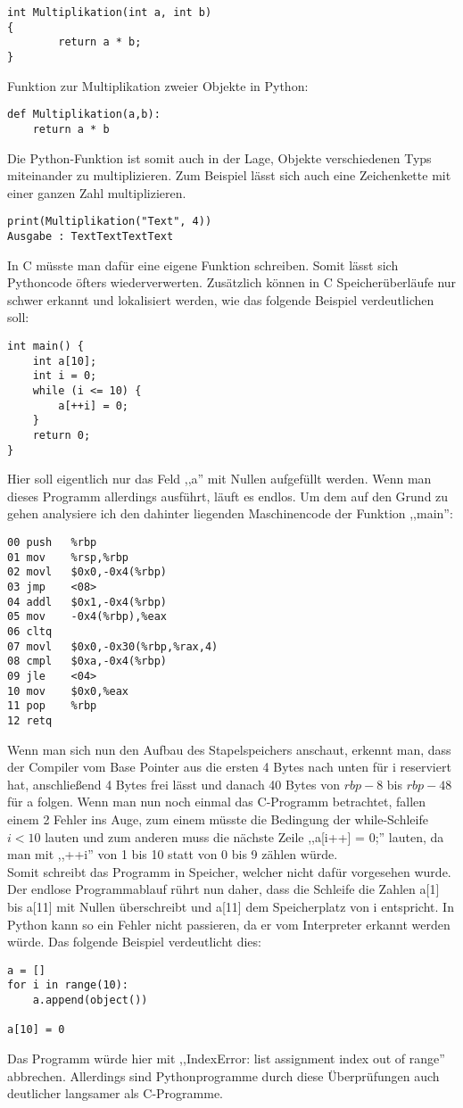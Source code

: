 \documentclass[hidelinks]{article}
\begin{document}
\begin{lstlisting}
int Multiplikation(int a, int b)
{
        return a * b;
}
\end{lstlisting}
Funktion zur Multiplikation zweier Objekte in Python:
\begin{lstlisting}
def Multiplikation(a,b):
    return a * b
\end{lstlisting}
Die Python-Funktion ist somit auch in der Lage, Objekte verschiedenen Typs miteinander zu multiplizieren. Zum Beispiel lässt sich auch eine Zeichenkette mit einer ganzen Zahl multiplizieren.
\begin{lstlisting}
print(Multiplikation("Text", 4))
Ausgabe : TextTextTextText
\end{lstlisting}
In C müsste man dafür eine eigene Funktion schreiben. Somit lässt sich Pythoncode öfters wiederverwerten.
Zusätzlich können in C Speicherüberläufe nur schwer erkannt und lokalisiert werden, wie das folgende Beispiel verdeutlichen soll:
\begin{lstlisting}
int main() {
    int a[10];
    int i = 0;
    while (i <= 10) {
        a[++i] = 0;
    }
    return 0;
}
\end{lstlisting}
Hier soll eigentlich nur das Feld ,,a'' mit Nullen aufgefüllt werden. Wenn man dieses Programm allerdings ausführt, läuft es endlos. Um dem auf den Grund zu gehen analysiere ich den dahinter liegenden Maschinencode der Funktion ,,main'':
\begin{lstlisting}
00 push   %rbp
01 mov    %rsp,%rbp
02 movl   $0x0,-0x4(%rbp)
03 jmp    <08>
04 addl   $0x1,-0x4(%rbp)
05 mov    -0x4(%rbp),%eax
06 cltq   
07 movl   $0x0,-0x30(%rbp,%rax,4)
08 cmpl   $0xa,-0x4(%rbp)
09 jle    <04>
10 mov    $0x0,%eax
11 pop    %rbp
12 retq
\end{lstlisting}
Wenn man sich nun den Aufbau des Stapelspeichers anschaut, erkennt man, dass der Compiler vom Base Pointer aus die ersten 4 Bytes nach unten für i reserviert hat, anschließend 4 Bytes frei lässt und danach 40 Bytes von $rbp-8$ bis $rbp-48$ für a folgen. Wenn man nun noch einmal das C-Programm betrachtet, fallen einem 2 Fehler ins Auge, zum einem müsste die Bedingung der while-Schleife $i < 10$ lauten und zum anderen muss die nächste Zeile ,,a[i++] = 0;'' lauten, da man mit ,,++i'' von 1 bis 10 statt von 0 bis 9 zählen würde.\\
Somit schreibt das Programm in Speicher, welcher nicht dafür vorgesehen wurde. Der endlose Programmablauf rührt nun daher, dass die Schleife die Zahlen a[1] bis a[11] mit Nullen überschreibt und a[11] dem Speicherplatz von i entspricht. In Python kann so ein Fehler nicht passieren, da er vom Interpreter erkannt werden würde.
Das folgende Beispiel verdeutlicht dies:
\begin{lstlisting}
a = []
for i in range(10):
    a.append(object())

a[10] = 0
\end{lstlisting}
Das Programm würde hier mit ,,IndexError: list assignment index out of range'' abbrechen. Allerdings sind Pythonprogramme durch diese Überprüfungen auch deutlicher langsamer als C-Programme.
\end{document}
